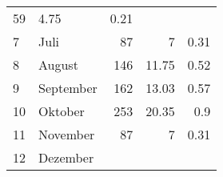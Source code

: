 \begin{longtable}{lXrrr}
       \num{59} &
       \num[round-mode=places,round-precision=2]{4,75} &
         \num[round-mode=places,round-precision=2]{0,21} \\

     7 &
     \multicolumn{1}{X}{ Juli   } &


       \num{87} &
       \num[round-mode=places,round-precision=2]{7} &
         \num[round-mode=places,round-precision=2]{0,31} \\

     8 &
     \multicolumn{1}{X}{ August   } &


       \num{146} &
       \num[round-mode=places,round-precision=2]{11,75} &
         \num[round-mode=places,round-precision=2]{0,52} \\

     9 &
     \multicolumn{1}{X}{ September   } &


       \num{162} &
       \num[round-mode=places,round-precision=2]{13,03} &
         \num[round-mode=places,round-precision=2]{0,57} \\

     10 &
     \multicolumn{1}{X}{ Oktober   } &


       \num{253} &
       \num[round-mode=places,round-precision=2]{20,35} &
         \num[round-mode=places,round-precision=2]{0,9} \\

     11 &
     \multicolumn{1}{X}{ November   } &


       \num{87} &
       \num[round-mode=places,round-precision=2]{7} &
         \num[round-mode=places,round-precision=2]{0,31} \\

     12 &
     \multicolumn{1}{X}{ Dezember   } &



\end{longtable}
